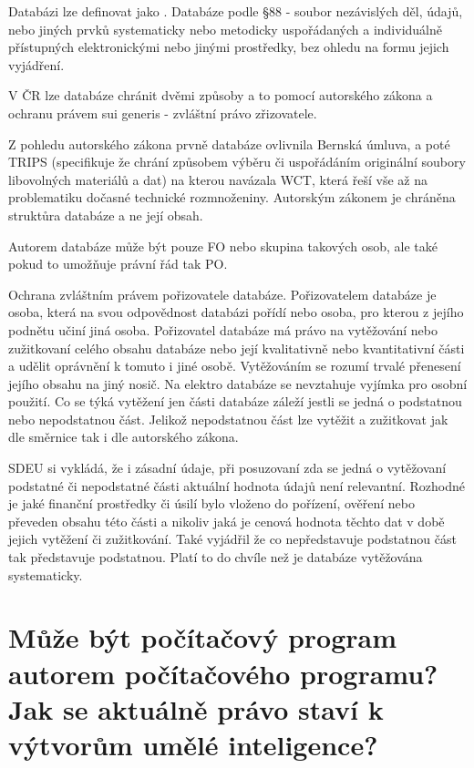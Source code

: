 \documentclass[12pt,a4paper,czech]{article}
\newcommand{\nadpis}[1]{{\section{#1}}}
\begin{document}
Databázi lze definovat jako .\newline
Databáze podle §88 - soubor nezávislých děl, údajů, nebo jiných prvků systematicky nebo metodicky uspořádaných a individuálně přístupných elektronickými nebo jinými prostředky, bez ohledu na formu jejich vyjádření.

V ČR lze databáze chránit dvěmi způsoby a to pomocí autorského zákona a ochranu právem sui generis - zvláštní právo zřizovatele.

Z pohledu autorského zákona prvně databáze ovlivnila Bernská úmluva, a poté TRIPS (specifikuje že chrání způsobem výběru či uspořádáním originální soubory libovolných materiálů a dat) na kterou navázala WCT, která řeší vše až na problematiku dočasné technické rozmnoženiny. Autorským zákonem je chráněna struktůra databáze a ne její obsah. 

Autorem databáze může být pouze FO nebo skupina takových osob, ale také pokud to umožňuje právní řád tak PO.

Ochrana zvláštním právem pořizovatele databáze. Pořizovatelem databáze je osoba, která na svou odpovědnost databázi pořídí nebo osoba, pro kterou z jejího podnětu učiní jiná osoba. Pořizovatel databáze má právo na vytěžování nebo zužitkovaní celého obsahu databáze nebo její kvalitativně nebo kvantitativní části a udělit oprávnění k tomuto i jiné osobě. Vytěžováním se rozumí trvalé přenesení jejího obsahu na jiný nosič. Na elektro databáze se nevztahuje vyjímka pro osobní použití. Co se týká vytěžení jen části databáze záleží jestli se jedná o podstatnou nebo nepodstatnou část. Jelikož nepodstatnou část lze vytěžit a zužitkovat jak dle směrnice tak i dle autorského zákona.

SDEU si vykládá, že i zásadní údaje, při posuzovaní zda se jedná o vytěžovaní podstatné či nepodstatné části aktuální hodnota údajů není relevantní. Rozhodné je jaké finanční prostředky či úsilí bylo vloženo do pořízení, ověření nebo převeden obsahu této části a nikoliv jaká je cenová hodnota těchto dat v době jejich vytěžení či zužitkování.
Také vyjádřil že co nepředstavuje podstatnou část tak představuje podstatnou. Platí to do chvíle než je databáze vytěžována systematicky.

\vspace{0.5cm} 
\nadpis{Může být počítačový program autorem počítačového programu? Jak se aktuálně právo staví k výtvorům umělé inteligence?}
\end{document}

